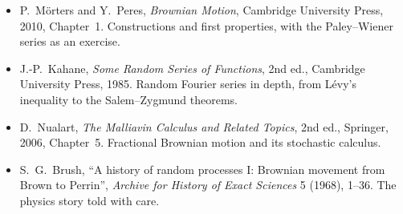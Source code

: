 \begin{itemize}
\item P.~M\"orters and Y.~Peres, \emph{Brownian Motion}, Cambridge University Press, 2010, Chapter~1. Constructions and first properties, with the Paley--Wiener series as an exercise.
\item J.-P.~Kahane, \emph{Some Random Series of Functions}, 2nd ed., Cambridge University Press, 1985. Random Fourier series in depth, from L\'evy's inequality to the Salem--Zygmund theorems.
\item D.~Nualart, \emph{The Malliavin Calculus and Related Topics}, 2nd ed., Springer, 2006, Chapter~5. Fractional Brownian motion and its stochastic calculus.
\item S.~G.~Brush, ``A history of random processes I: Brownian movement from Brown to Perrin'', \emph{Archive for History of Exact Sciences} 5 (1968), 1--36. The physics story told with care.
\end{itemize}
